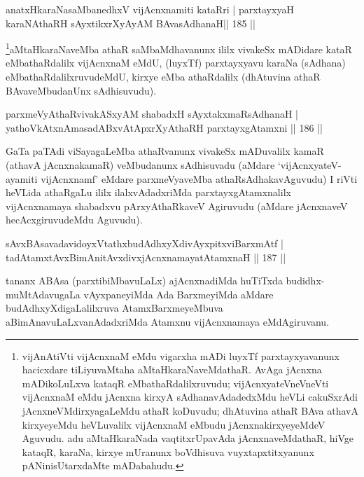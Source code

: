 \begin{shl}
anatxHkaraNasaMbanedhxV vijAcnxnamiti kataRri |
parxtayxyaH karaNAthaRH sAyxtikxrXyAyAM BAvasAdhanaH\hfill || 185 ||
\end{shl}

\begin{artha}
\footnote{vijAnAtiVti vijAcnxnaM eMdu vigarxha mADi luyxTf  parxtayxyavanunx hacicxdare tiLiyuvaMtaha aMtaHkaraNaveMdathaR. AvAga  jAcnxna mADikoLuLxva kataqR eMbathaRdalilxruvudu; vijAcnxyateV\s neVneVti vijAcnxnaM eMdu jAcnxna kirxyA sAdhanavAdadedxMdu heVLi cakuSxrAdi jAcnxneVMdirxyagaLeMdu athaR koDuvudu; dhAtuvina athaR BAva athavA kirxyeyeMdu heVLuvalilx vijAcnxnaM eMbudu jAcnxnakirxyeyeMdeV Aguvudu. adu aMtaHkaraNada vaqtitxrUpavAda jAcnxnaveMdathaR, hiVge kataqR, karaNa, kirxye mUranunx boVdhisuva vuyxtapxtitxyanunx pANinisUtarxdaMte mADabahudu.}aMtaHkaraNaveMba athaR saMbaMdhavanunx ililx vivakeSx mADidare kataR eMbathaRdalilx vijAcnxnaM eMdU, (luyxTf) parxtayxyavu karaNa (sAdhana) eMbathaRdalilxruvudeMdU, kirxye eMba athaRdalilx (dhAtuvina athaR BAvaveMbudanUnx sAdhisuvudu).
\end{artha}

\begin{shl}
parxmeVyAthaRvivakASxyAM shabadxH sAyxtakxmaRsAdhanaH |\\
yathoVkAtxnAmasadABxvAtApxrXyAthaRH parxtayxgAtamxni \hfill || 186 ||
\end{shl}

\begin{artha}
GaTa paTAdi viSayagaLeMba athaRvanunx vivakeSx mADuvalilx kamaR (athavA 
jAcnxnakamaR) veMbudanunx sAdhisuvadu (aMdare `vijAcnxyateV-ayamiti vijAcnxnamf' eMdare parxmeVyaveMba athaRsAdhakavAguvudu) I riVti heVLida athaRgaLu ililx ilalxvAdadxriMda parxtayxgAtamxnalilx vijAcnxnamaya shabadxvu pArxyAthaRkaveV Agiruvudu (aMdare jAcnxnaveV hecAcxgiruvudeMdu Aguvudu).\\
\end{artha}


\begin{shl}
sAvxBAsavadavidoyxVtathxbudAdhxyXdivAyxpitxviBarxmAtf |\\
tadAtamxtAvxBimAnitAvxdivxjAcnxnamayatA\s \s tamxnaH \hfill || 187 ||
\end{shl}

\begin{artha}
tananx ABAsa (parxtibiMbavuLaLx) ajAcnxnadiMda huTiTxda budidhx-muMtAdavugaLa vAyxpaneyiMda Ada BarxmeyiMda aMdare budAdhxyXdigaLalilxruva AtamxBarxmeyeMbuva aBimAnavuLaLxvanAdadxriMda Atamxnu vijAcnxnamaya eMdAgiruvanu.
\end{artha}

